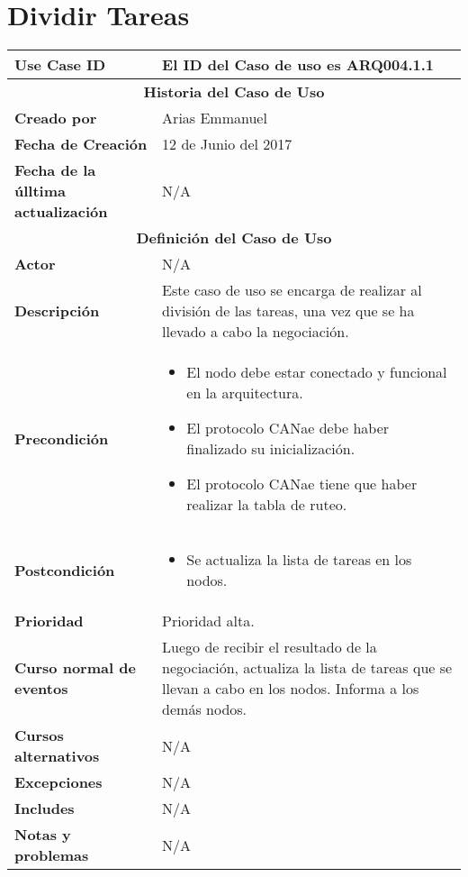 
\section{Dividir Tareas}\label{uc:DividirTareas}

\begin{longtable}{|p{5cm}|p{8cm}|}
  \hline
  \textbf{Use Case ID} & El ID del Caso de uso es ARQ004.1.1 \\ \hline
  \multicolumn{2}{|c|}{\Large\textbf{Historia del Caso de Uso}} \\ \hline
  \textbf{Creado por} & Arias Emmanuel \\ \hline
  \textbf{Fecha de Creación} & 12 de Junio del 2017 \\ \hline
  \textbf{Fecha de la úlltima actualización} & N/A \\ \hline
  \multicolumn{2}{|c|}{\Large\textbf{Definición del Caso de Uso}} \\ \hline
  \textbf{Actor} & N/A \\ \hline
  \textbf{Descripción} & Este caso de uso se encarga de realizar al división de las tareas,
una vez que se ha llevado a cabo la negociación. \\ \hline
  \textbf{Precondición} & \begin{itemize}
\item El nodo debe estar conectado y funcional en la arquitectura.
\item El protocolo CANae debe haber finalizado su inicialización.
\item El protocolo CANae tiene que haber realizar la tabla de ruteo.
\end{itemize} \\ \hline
  \textbf{Postcondición}  & \begin{itemize}
  \item Se actualiza la lista de tareas en los nodos.
\end{itemize} \\ \hline
  \textbf{Prioridad} & Prioridad alta. \\ \hline
  \textbf{Curso normal de eventos} & Luego de recibir el resultado de la negociación, actualiza la lista
de tareas que se llevan a cabo en los nodos. Informa a los demás nodos. \\ \hline
\textbf{Cursos alternativos} & N/A \\ \hline
\textbf{Excepciones} & N/A \\ \hline
\textbf{Includes} & N/A \\ \hline
\textbf{Notas y problemas} & N/A \\ \hline
\end{longtable}

